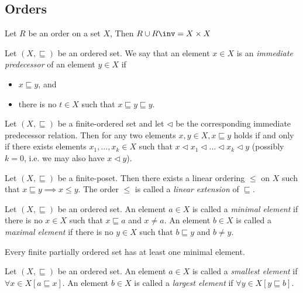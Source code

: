 \documentclass{classnotes}
\begin{document}
\subsection{Orders}
\begin{proposition}
    Let $R$ be an order on a set $X$, Then $R \cup R\inv = X \times X$
\end{proposition}
\begin{definition}
    Let $(X, \sqsubseteq)$ be an ordered set. We say that an element $x \in X$ is an \emph{immediate predecessor} of an element $y \in X$ if
    \begin{itemize}
        \item $x \sqsubseteq y$, and
        \item there is no $t \in X$ such that $x \sqsubseteq y \sqsubseteq y$.
    \end{itemize}
\end{definition}
\begin{proposition}
    Let $(X,\sqsubseteq)$ be a finite-ordered set and let $\lhd$ be the corresponding immediate predecessor relation.
    Then for any two elements $x,y \in X, x \sqsubseteq y$ holds if and only if there exists elements $x_1,\dots,x_k \in X$
    such that $x \lhd x_1 \lhd \dots \lhd x_k \lhd y$ (possibly $k=0$, i.e. we may also have $x \lhd y$).
\end{proposition}

\begin{theorem}
    Let $(X,\sqsubseteq)$ be a finite-poset. Then there exists a linear ordering $\le$ on $X$ such that $x \sqsubseteq y \implies x \le y$.
    The order $\le$ is called a \emph{linear extension} of $\sqsubseteq$.
\end{theorem}

\begin{definition}
    Let $(X,\sqsubseteq)$ be an ordered set. An element $a \in X$ is called a \emph{minimal element} if there is no $x \in X$ such that $x \sqsubseteq a$ and $x \ne a$.
    An element $b \in X$ is called a \emph{maximal element} if there is no $y \in X$ such that $b \sqsubseteq y$ and $b \ne y$.
\end{definition}

\begin{theorem}
    Every finite partially ordered set has at least one minimal element.
\end{theorem}

\begin{definition}
    Let $(X,\sqsubseteq)$ be an ordered set. An element $a \in X$ is called a \emph{smallest element} if $\forall x \in X [a \sqsubseteq x]$.
    An element $b \in X$ is called a \emph{largest element} if $\forall y \in X [y \sqsubseteq b]$.
\end{definition}
\end{document}
